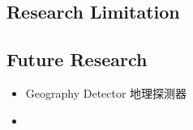 \documentclass[
]{article}
\providecommand{\tightlist}{%
  \setlength{\itemsep}{0pt}\setlength{\parskip}{0pt}}
\begin{document}
\hypertarget{research-limitation}{%
\subsection{Research Limitation}\label{research-limitation}}

\hypertarget{future-research}{%
\subsection{Future Research}\label{future-research}}

\begin{itemize}
\tightlist
\item
  Geography Detector 地理探测器
\item
\end{itemize}

  
\end{document}
